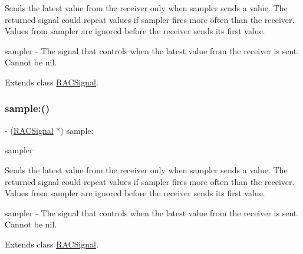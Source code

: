 Sends the latest value from the receiver only when {\ttfamily sampler} sends a value. The returned signal could repeat values if {\ttfamily sampler} fires more often than the receiver. Values from {\ttfamily sampler} are ignored before the receiver sends its first value.

sampler -\/ The signal that controls when the latest value from the receiver is sent. Cannot be nil. 

Extends class \mbox{\hyperlink{interface_r_a_c_signal_a556702f113ba65f01fabf8363bd25e46}{R\+A\+C\+Signal}}.

\mbox{\label{category_r_a_c_signal_07_operations_08_a556702f113ba65f01fabf8363bd25e46}} 
\subsubsection{\texorpdfstring{sample\+:()}{sample:()}\hspace{0.1cm}{\footnotesize\ttfamily [3/3]}}
{\footnotesize\ttfamily -\/ (\mbox{\hyperlink{interface_r_a_c_signal}{R\+A\+C\+Signal}} $\ast$) sample\+: \begin{DoxyParamCaption}\item[{(\mbox{\hyperlink{interface_r_a_c_signal}{R\+A\+C\+Signal}} $\ast$)}]{sampler }\end{DoxyParamCaption}}

Sends the latest value from the receiver only when {\ttfamily sampler} sends a value. The returned signal could repeat values if {\ttfamily sampler} fires more often than the receiver. Values from {\ttfamily sampler} are ignored before the receiver sends its first value.

sampler -\/ The signal that controls when the latest value from the receiver is sent. Cannot be nil. 

Extends class \mbox{\hyperlink{interface_r_a_c_signal_a556702f113ba65f01fabf8363bd25e46}{R\+A\+C\+Signal}}.

\mbox{\label{category_r_a_c_signal_07_operations_08_ada2a2f51a30fb8bef13819c50ebfbf85}} 
